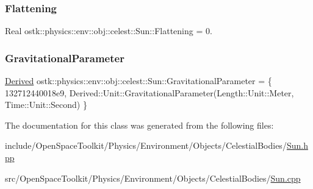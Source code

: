 \subsubsection{\texorpdfstring{Flattening}{Flattening}}
{\footnotesize\ttfamily Real ostk\+::physics\+::env\+::obj\+::celest\+::\+Sun\+::\+Flattening = 0.\hspace{0.3cm}{\ttfamily [static]}}

\mbox{\label{classostk_1_1physics_1_1env_1_1obj_1_1celest_1_1_sun_ab53baca68d9a8eaef2aa734011e29cc0}} 
\subsubsection{\texorpdfstring{Gravitational\+Parameter}{GravitationalParameter}}
{\footnotesize\ttfamily \hyperlink{classostk_1_1physics_1_1units_1_1_derived}{Derived} ostk\+::physics\+::env\+::obj\+::celest\+::\+Sun\+::\+Gravitational\+Parameter = \{ 132712440018e9, Derived\+::\+Unit\+::\+Gravitational\+Parameter(\+Length\+::\+Unit\+::\+Meter, Time\+::\+Unit\+::\+Second) \}\hspace{0.3cm}{\ttfamily [static]}}



The documentation for this class was generated from the following files\+:\begin{DoxyCompactItemize}
\item 
include/\+Open\+Space\+Toolkit/\+Physics/\+Environment/\+Objects/\+Celestial\+Bodies/\hyperlink{_sun_8hpp}{Sun.\+hpp}\item 
src/\+Open\+Space\+Toolkit/\+Physics/\+Environment/\+Objects/\+Celestial\+Bodies/\hyperlink{_sun_8cpp}{Sun.\+cpp}\end{DoxyCompactItemize}
